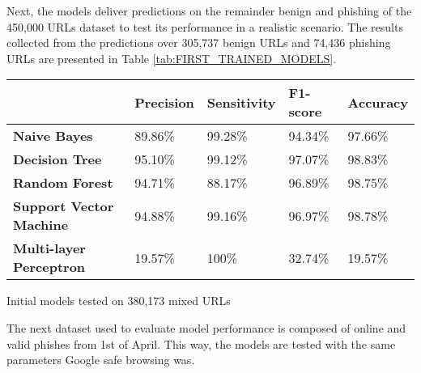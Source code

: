 Next, the models deliver predictions on the remainder benign and phishing of the 450,000 URLs dataset to test its performance in a realistic scenario. The results collected from the predictions over 305,737 benign URLs and 74,436 phishing URLs are presented in Table \ref{tab:FIRST_TRAINED_MODELS}.

\begin{singlespace}
	\begin{center}
		\label{tab:FIRST_TRAINED_MODELS}
		\begin{tabular}{ | m{13em} | m{5em} | m{5em} | m{5em} | m{5em} | }
			\hline
			                                & \textbf{Precision} & \textbf{Sensitivity} & \textbf{F1-score} & \textbf{Accuracy} \\
			\hline
			\textbf{Naive Bayes}            & 89.86\%            & 99.28\%              & 94.34\%           & 97.66\%           \\
			\hline
			\textbf{Decision Tree}          & 95.10\%            & 99.12\%              & 97.07\%           & 98.83\%           \\
			\hline
			\textbf{Random Forest}          & 94.71\%            & 88.17\%              & 96.89\%           & 98.75\%           \\
			\hline
			\textbf{Support Vector Machine} & 94.88\%            & 99.16\%              & 96.97\%           & 98.78\%           \\
			\hline
			\textbf{Multi-layer Perceptron} & 19.57\%            & 100\%                & 32.74\%           & 19.57\%           \\
			\hline
		\end{tabular}
		\captionsetup{type=table}\caption{Initial models tested on 380,173 mixed URLs}
	\end{center}
\end{singlespace}

The next dataset used to evaluate model performance is composed of online and valid phishes from 1st of April. This way, the models are tested with the same parameters Google safe browsing was.

